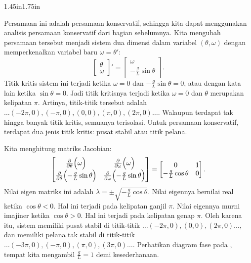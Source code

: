 \begin{mywrapfigsimp}{1.45in}{1.75in}
\noindent
{}
\end{mywrapfigsimp}
Persamaan ini adalah persamaan konservatif, sehingga kita dapat menggunakan
analisis persamaan konservatif dari bagian sebelumnya.
Kita mengubah persamaan tersebut menjadi sistem dua dimensi
dalam variabel $(\theta,\omega)$ dengan memperkenalkan variabel baru
$\omega = \theta'$:
\begin{equation*}
\begin{bmatrix}
\theta \\ \omega
\end{bmatrix} '
=
\begin{bmatrix}
\omega \\
- \frac{g}{L} \sin \theta
\end{bmatrix} .
\end{equation*}
Titik kritis sistem ini terjadi ketika $\omega = 0$ dan $-\frac{g}{L}
\sin \theta = 0$, atau dengan kata lain ketika $\sin \theta = 0$. Jadi titik
kritisnya terjadi ketika $\omega = 0$ dan $\theta$ merupakan kelipatan
$\pi$. Artinya, titik-titik tersebut adalah $\ldots (-2\pi,0), (-\pi,0),
(0,0), (\pi,0), (2\pi,0) \ldots$. Walaupun terdapat tak hingga banyak titik
kritis, semuanya terisolasi. Untuk persamaan konservatif, terdapat dua jenis
titik kritis: pusat stabil atau titik pelana.

Kita menghitung matriks Jacobian:
\begin{equation*}
\begin{bmatrix}
\frac{\partial}{\partial \theta} \Bigl( \omega \Bigr) & 
\frac{\partial}{\partial \omega} \Bigl( \omega \Bigr) \\
\frac{\partial}{\partial \theta} \Bigl( - \frac{g}{L} \sin \theta \Bigr) & 
\frac{\partial}{\partial \omega} \Bigl( - \frac{g}{L} \sin \theta \Bigr)
\end{bmatrix}
=
\begin{bmatrix}
0 & 1 \\
- \frac{g}{L} \cos \theta & 0
\end{bmatrix} .
\end{equation*}
Nilai eigen matriks ini adalah
$\lambda = \pm \sqrt{-\frac{g}{L}\cos \theta}$.
Nilai eigennya bernilai real ketika $\cos \theta < 0$. Hal ini terjadi pada
kelipatan ganjil $\pi$. Nilai eigennya murni imajiner ketika
$\cos \theta > 0$. Hal ini terjadi pada kelipatan genap $\pi$. Oleh karena
itu, sistem memiliki pusat stabil di titik-titik $\ldots (-2\pi,0), (0,0),
(2\pi,0) \ldots$, dan memiliki pelana tak stabil di titik-titik
$\ldots (-3\pi,0), (-\pi,0), (\pi,0), (3\pi,0) \ldots$. Perhatikan diagram
fase pada , tempat kita mengambil
$\frac{g}{L} = 1$ demi kesederhanaan.

